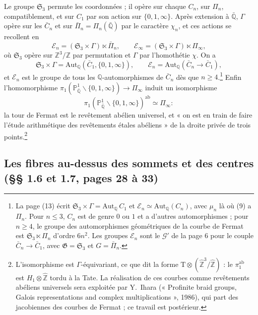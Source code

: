\documentclass[11pt,a4paper]{article}
\begin{document}
Le groupe $\mathfrak{S}_{3}$ permute les coordonnées ; il opère sur chaque
$C_{n}$, sur $\Pi_{n}$, compatiblement, et sur $C_{1}$ par son action sur $\{0,
1, \infty\}$. Après extension à $\bar{\mathbb{Q}}$, $\Gamma$ opère sur les
$\bar{C}_{n}$ et sur $\bar{\Pi}_{n} = \Pi_{n}(\bar{\mathbb{Q}})$ par le caractère
$\chi_{n}$, et ces actions se recollent en
\[
\mathcal{E}_{n} = (\mathfrak{S}_{3} \times \Gamma) \ltimes \bar{\Pi}_{n},
\qquad
\mathcal{E}_{\infty} = (\mathfrak{S}_{3} \times \Gamma) \ltimes \Pi_{\infty},
\]
où $\mathfrak{S}_{3}$ opère sur $\mathbb{Z}^{3}/\mathbb{Z}$ par permutation et
$\Gamma$ par l'homothétie $\chi$. On a
\[
\mathfrak{S}_{3} \times \Gamma = \mathrm{Aut}_{\mathbb{Q}}(\bar{C}_{1}, \{0, 1,
\infty\}), \qquad
\mathcal{E}_{n} = \mathrm{Aut}_{\mathbb{Q}}(\bar{C}_{n} \to \bar{C}_{1}),
\]
et $\mathcal{E}_{n}$ est le groupe de tous les $\mathbb{Q}$-automorphismes de
$\bar{C}_{n}$ dès que $n \geqslant 4$.\footnote{La page (13) écrit
$\mathfrak{S}_{3} \times \Gamma = \mathrm{Aut}_{\mathbb{Q}}\, C_{1}$ et
$\mathcal{E}_{n} \simeq \mathrm{Aut}_{\mathbb{Q}}(C_{n})$, avec $\mu_{n}$ là où
(9) a $\Pi_{n}$. Pour $n \leqslant 3$, $C_{n}$ est de genre $0$ ou $1$ et a
d'autres automorphismes ; pour $n \geqslant 4$, le groupe des automorphismes
géométriques de la courbe de Fermat est $\mathfrak{S}_{3} \ltimes \Pi_{n}$
d'ordre $6n^{2}$. Les groupes $\mathcal{E}_{n}$ sont le $\mathcal{G}'$ de la
page 6 pour le couple $\bar{C}_{n} \to \bar{C}_{1}$, avec $\mathfrak{G} =
\mathfrak{S}_{3}$ et $G = \bar{\Pi}_{n}$.} Enfin l'homomorphisme
$\pi_{1}(\mathbb{P}^{1}_{\bar{\mathbb{Q}}} \smallsetminus \{0, 1, \infty\}) \to
\Pi_{\infty}$ induit un isomorphisme
\[
\pi_{1}(\mathbb{P}^{1}_{\bar{\mathbb{Q}}} \smallsetminus \{0, 1,
\infty\})^{\mathrm{ab}} \simeq \Pi_{\infty} :
\]
la tour de Fermat est le revêtement abélien universel, et « on est en train de
faire l'étude arithmétique des revêtements étales abéliens » de la droite
privée de trois points.\footnote{L'isomorphisme est $\Gamma$-équivariant, ce
que dit la forme $\mathrm{T} \otimes (\widehat{\mathbb{Z}}^{3}/\widehat{\mathbb{Z}})$ :
le $\pi_{1}^{\mathrm{ab}}$ est $H_{1} \otimes \widehat{\mathbb{Z}}$ tordu à la
Tate. La réalisation de ces courbes comme revêtements abéliens universels
sera exploitée par Y.~Ihara (« Profinite braid groups, Galois representations
and complex multiplications », 1986), qui part des jacobiennes des courbes de
Fermat ; ce travail est postérieur.}

\subsection*{Les fibres au-dessus des sommets et des centres (§§ 1.6 et 1.7,
pages 28 à 33)}
\end{document}
